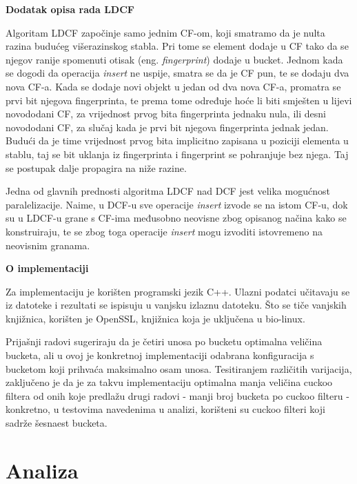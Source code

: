 \documentclass[times, utf8, seminar, numeric]{fer}
\begin{document}
\begin{flushleft}
\textbf{Dodatak opisa rada LDCF}
\end{flushleft}



Algoritam LDCF započinje samo jednim CF-om, koji smatramo da je nulta razina budućeg višerazinskog stabla. Pri tome se element dodaje u CF tako da se njegov ranije spomenuti otisak (eng. \textit{fingerprint}) dodaje u bucket. Jednom kada se dogodi da operacija \textit{insert} ne uspije, smatra se da je CF pun, te se dodaju dva nova CF-a. Kada se dodaje novi objekt u jedan od dva nova CF-a, promatra se prvi bit njegova fingerprinta, te prema tome određuje hoće li biti smješten u lijevi novododani CF, za vrijednost prvog bita fingerprinta jednaku nula, ili desni novododani CF, za slučaj kada je prvi bit njegova fingerprinta jednak jedan. Budući da je time vrijednost prvog bita implicitno zapisana u poziciji elementa u stablu, taj se bit uklanja iz fingerprinta i fingerprint se pohranjuje bez njega. Taj se postupak dalje propagira na niže razine.

Jedna od glavnih prednosti algoritma LDCF nad DCF jest velika mogućnost paralelizacije. Naime, u DCF-u sve operacije \textit{insert} izvode se na istom CF-u, dok su u LDCF-u grane s CF-ima međusobno neovisne zbog opisanog načina kako se konstruiraju, te se zbog toga operacije \textit{insert} mogu izvoditi istovremeno na neovisnim granama.


\begin{flushleft}
\textbf{O implementaciji}
\end{flushleft}

Za implementaciju je korišten programski jezik C++. Ulazni podatci učitavaju se iz datoteke i rezultati se ispisuju u vanjsku izlaznu datoteku. Što se tiče vanjskih knjižnica, korišten je OpenSSL, knjižnica koja je uključena u bio-linux.

Prijašnji radovi \cite{10.1145/3485983.3494852} sugeriraju da je četiri unosa po bucketu optimalna veličina bucketa, ali u ovoj je konkretnoj implementaciji odabrana konfiguracija s bucketom koji prihvaća maksimalno osam unosa. Tesitiranjem različitih varijacija, zaključeno je da je za takvu  implementaciju optimalna manja veličina cuckoo filtera od onih koje predlažu drugi radovi - manji broj bucketa po cuckoo filteru - konkretno, u testovima navedenima u analizi, korišteni su cuckoo filteri koji sadrže šesnaest bucketa.
 
\chapter{Analiza}
\label{Analiza}
\end{document}
